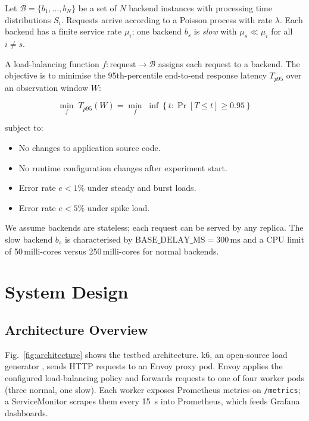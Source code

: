 \documentclass[conference]{IEEEtran}
\begin{document}
Let $\mathcal{B} = \{b_1, \ldots, b_N\}$ be a set of $N$ backend instances
with processing time distributions $S_i$.
Requests arrive according to a Poisson process with rate $\lambda$.
Each backend has a finite service rate $\mu_i$; one backend $b_s$ is
\textit{slow} with $\mu_s \ll \mu_i$ for all $i \neq s$.

A load-balancing function $f : \text{request} \to \mathcal{B}$ assigns each
request to a backend.
The objective is to minimise the 95th-percentile end-to-end response
latency $T_{p95}$ over an observation window $W$:

\begin{equation}
  \min_{f} \; T_{p95}(W) = \min_{f} \; \inf\!\left\{t : \Pr[T \le t] \ge 0.95\right\}
\end{equation}

subject to:
\begin{itemize}
  \item No changes to application source code.
  \item No runtime configuration changes after experiment start.
  \item Error rate $e < 1\%$ under steady and burst loads.
  \item Error rate $e < 5\%$ under spike load.
\end{itemize}

We assume backends are stateless; each request can be served by any replica.
The slow backend $b_s$ is characterised by $\text{BASE\_DELAY\_MS} = 300\,\text{ms}$
and a CPU limit of 50\,milli-cores versus 250\,milli-cores for normal backends.

\section{System Design}
\label{sec:design}

\subsection{Architecture Overview}

Fig.~\ref{fig:architecture} shows the testbed architecture.
k6, an open-source load generator \cite{k6loadtesting}, sends HTTP requests
to an Envoy proxy pod.
Envoy applies the configured load-balancing policy and forwards requests to
one of four worker pods (three normal, one slow).
Each worker exposes Prometheus metrics on \texttt{/metrics}; a
ServiceMonitor scrapes them every 15~s into Prometheus, which feeds
Grafana dashboards.
\end{document}
